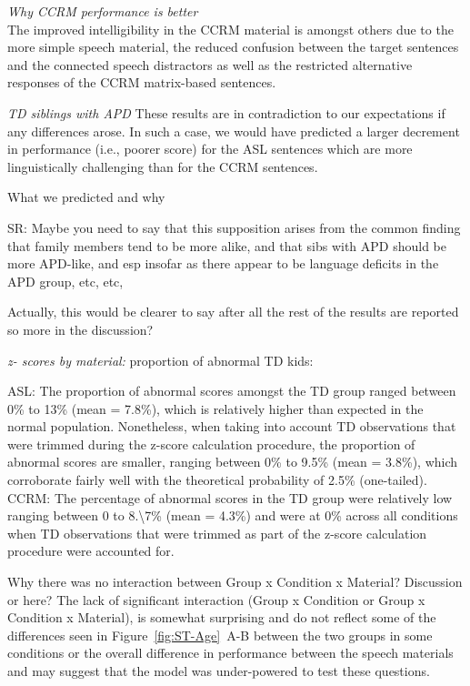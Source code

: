\documentclass[a4paper, twoside]{templates/ociamthesis}
\begin{document}
\colorbox[HTML]{CCCCFF}{\emph{Why CCRM performance is better}}\\
The improved intelligibility in the CCRM material is amongst others due to the more simple speech material, the reduced confusion between the target sentences and the connected speech distractors as well as the restricted alternative responses of the CCRM matrix-based sentences.

\colorbox[HTML]{CCCCFF}{\emph{TD siblings with APD}}
These results are in contradiction to our expectations if any differences arose. In such a case, we would have predicted a larger decrement in performance (i.e., poorer score) for the ASL sentences which are more linguistically challenging than for the CCRM sentences.

What we predicted and why

SR:
Maybe you need to say that this supposition arises from the common finding that family members tend to be more alike, and that sibs with APD should be more APD-like, and esp insofar as there appear to be language deficits in the APD group, etc, etc,

Actually, this would be clearer to say after all the rest of the results are reported so more in the discussion?

\colorbox[HTML]{CCCCFF}{\emph{z- scores by material:}}
proportion of abnormal TD kids:

ASL:
The proportion of abnormal scores amongst the TD group ranged between 0\% to 13\% (mean = 7.8\%), which is relatively higher than expected in the normal population. Nonetheless, when taking into account TD observations that were trimmed during the z-score calculation procedure, the proportion of abnormal scores are smaller, ranging between 0\% to 9.5\% (mean = 3.8\%), which corroborate fairly well with the theoretical probability of 2.5\% (one-tailed).\\

CCRM:
The percentage of abnormal scores in the TD group were relatively low ranging between 0 to 8.\textbackslash7\% (mean = 4.3\%) and were at 0\% across all conditions when TD observations that were trimmed as part of the z-score calculation procedure were accounted for.

Why there was no interaction between Group x Condition x Material?
\colorbox[HTML]{CCCCFF}{Discussion or here?} The lack of significant interaction (Group x Condition or Group x Condition x Material), is somewhat surprising and do not reflect some of the differences seen in Figure~\ref{fig:ST-Age}~A-B between the two groups in some conditions or the overall difference in performance between the speech materials and may suggest that the model was under-powered to test these questions.
\end{document}
